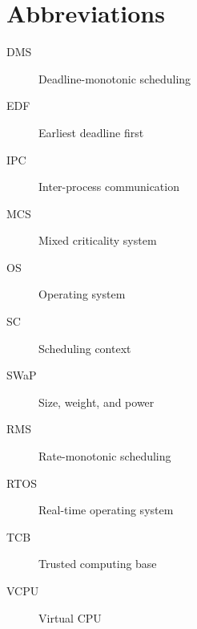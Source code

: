 \chapter*{Abbreviations}\label{abbr}

\begin{description}
\item[DMS] Deadline-monotonic scheduling
\item[EDF] Earliest deadline first
\item[IPC] Inter-process communication
\item[MCS] Mixed criticality system
\item[OS] Operating system
\item[SC] Scheduling context
\item[SWaP] Size, weight, and power
\item[RMS] Rate-monotonic scheduling
\item[RTOS] Real-time operating system
\item[TCB] Trusted computing base
\item[VCPU] Virtual CPU
\end{description}
